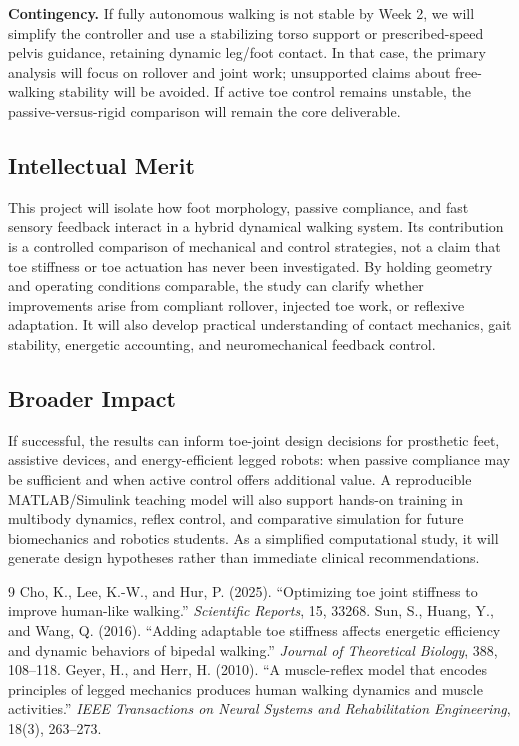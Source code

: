 \documentclass[11pt,letterpaper]{article}
\begin{document}
\textbf{Contingency.} If fully autonomous walking is not stable by Week 2, we will simplify the controller and use a stabilizing torso support or prescribed-speed pelvis guidance, retaining dynamic leg/foot contact. In that case, the primary analysis will focus on rollover and joint work; unsupported claims about free-walking stability will be avoided. If active toe control remains unstable, the passive-versus-rigid comparison will remain the core deliverable.

\subsection{Intellectual Merit}
This project will isolate how foot morphology, passive compliance, and fast sensory feedback interact in a hybrid dynamical walking system. Its contribution is a controlled comparison of mechanical and control strategies, not a claim that toe stiffness or toe actuation has never been investigated. By holding geometry and operating conditions comparable, the study can clarify whether improvements arise from compliant rollover, injected toe work, or reflexive adaptation. It will also develop practical understanding of contact mechanics, gait stability, energetic accounting, and neuromechanical feedback control.

\subsection{Broader Impact}
If successful, the results can inform toe-joint design decisions for prosthetic feet, assistive devices, and energy-efficient legged robots: when passive compliance may be sufficient and when active control offers additional value. A reproducible MATLAB/Simulink teaching model will also support hands-on training in multibody dynamics, reflex control, and comparative simulation for future biomechanics and robotics students. As a simplified computational study, it will generate design hypotheses rather than immediate clinical recommendations.

\vspace{-0.35em}
\begin{thebibliography}{9}
\setlength{\itemsep}{0pt}
\setlength{\parskip}{0pt}
\small
{} Cho, K., Lee, K.-W., and Hur, P. (2025). ``Optimizing toe joint stiffness to improve human-like walking.'' \emph{Scientific Reports}, 15, 33268.
 Sun, S., Huang, Y., and Wang, Q. (2016). ``Adding adaptable toe stiffness affects energetic efficiency and dynamic behaviors of bipedal walking.'' \emph{Journal of Theoretical Biology}, 388, 108--118.
 Geyer, H., and Herr, H. (2010). ``A muscle-reflex model that encodes principles of legged mechanics produces human walking dynamics and muscle activities.'' \emph{IEEE Transactions on Neural Systems and Rehabilitation Engineering}, 18(3), 263--273.
\end{thebibliography}
\end{document}
